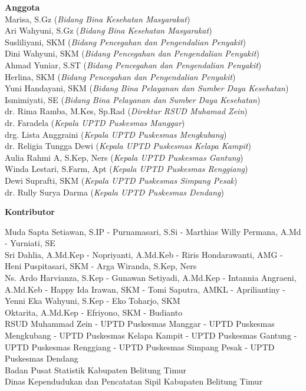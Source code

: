 {\textbf{Anggota}\\
\smallskip
Marisa, S.Gz (\emph{Bidang Bina Kesehatan Masyarakat})\\
\smallskip
Ari Wahyuni, S.Gz (\emph{Bidang Bina Kesehatan Masyarakat})\\
\smallskip
Susliliyani, SKM (\emph{Bidang Pencegahan dan Pengendalian Penyakit})\\
\smallskip
Dini Wahyuni, SKM (\emph{Bidang Pencegahan dan Pengendalian Penyakit})\\
\smallskip
Ahmad Yuniar, S.ST (\emph{Bidang Pencegahan dan Pengendalian Penyakit})\\
\smallskip
Herlina, SKM (\emph{Bidang Pencegahan dan Pengendalian Penyakit})\\
\smallskip
Yuni Handayani, SKM (\emph{Bidang Bina Pelayanan dan Sumber Daya Kesehatan})\\
\smallskip
Ismimiyati, SE (\emph{Bidang Bina Pelayanan dan Sumber Daya Kesehatan})\\
\smallskip
dr. Rima Ramba, M.Kes, Sp.Rad (\emph{Direktur RSUD Muhamad Zein})\\
\smallskip
dr. Faradela (\emph{Kepala UPTD Puskesmas Manggar})\\
\smallskip
drg. Lista Anggraini (\emph{Kepala UPTD Puskesmas Mengkubang})\\
\smallskip
dr. Religia Tungga Dewi (\emph{Kepala UPTD Puskesmas Kelapa Kampit})\\
\smallskip
Aulia Rahmi A, S.Kep, Ners (\emph{Kepala UPTD Puskesmas Gantung})\\
\smallskip
Winda Lestari, S.Farm, Apt (\emph{Kepala UPTD Puskesmas Renggiang})\\
\smallskip
Dewi Suprafti, SKM (\emph{Kepala UPTD Puskesmas Simpang Pesak})\\
\smallskip
dr. Rully Surya Darma (\emph{Kepala UPTD Puskesmas Dendang})
\bigskip

\textbf{Kontributor}\\
\begin{raggedright}
\smallskip
Muda Sapta Setiawan, S.IP - Purnamasari, S.Si - Marthias Willy Permana, A.Md - Yurniati, SE\\
\smallskip
Sri Dahlia, A.Md.Kep - Nopriyanti, A.Md.Keb - Riris Hondarawanti, AMG - Heni Puspitasari, SKM - Arga Wiranda, S.Kep, Ners\\
\smallskip
Ns. Ardo Harvianza, S.Kep - Gunawan Setiyadi, A.Md.Kep - Intannia Angraeni, A.Md.Keb - Happy Ida Irawan, SKM - Tomi Saputra, AMKL - Apriliantiny - Yenni Eka Wahyuni, S.Kep - Eko Toharjo, SKM\\
\smallskip
Oktarita, A.Md.Kep - Efriyono, SKM - Budianto\\
\smallskip
RSUD Muhammad Zein - UPTD Puskesmas Manggar - UPTD Puskesmas Mengkubang
- UPTD Puskesmas Kelapa Kampit - UPTD Puskesmas Gantung - UPTD Puskesmas
Renggiang - UPTD Puskesmas Simpang Pesak - UPTD Puskesmas Dendang \\
\smallskip
Badan Pusat Statistik Kabupaten Belitung Timur\\
\smallskip
Dinas Kependudukan dan Pencatatan Sipil Kabupaten Belitung Timur
\end{raggedright}

}